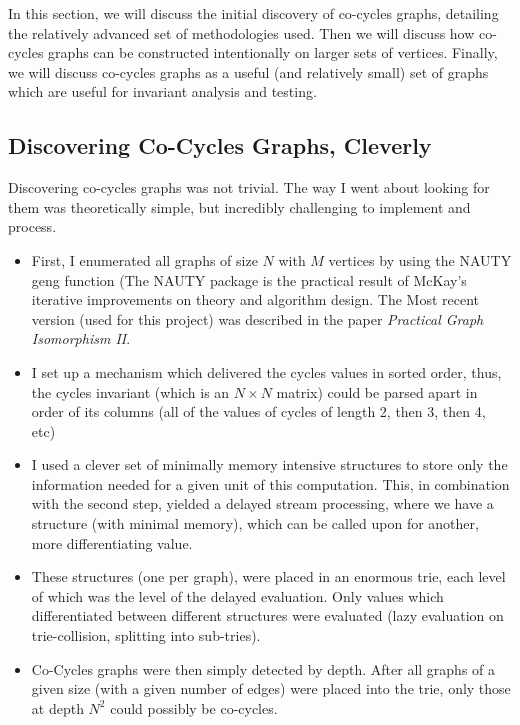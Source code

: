 In this section, we will discuss the initial discovery of co-cycles graphs, detailing the relatively advanced set of methodologies used.
Then we will discuss how co-cycles graphs can be constructed intentionally on larger sets of vertices.
Finally, we will discuss co-cycles graphs as a useful (and relatively small) set of graphs which are useful for invariant analysis and testing.

\subsection{Discovering Co-Cycles Graphs, Cleverly}

Discovering co-cycles graphs was not trivial.
The way I went about looking for them was theoretically simple, but incredibly challenging to implement and process.
\begin{itemize}
\item{First, I enumerated all graphs of size $N$ with $M$ vertices by using the NAUTY geng function (The NAUTY package is the practical result of McKay's iterative improvements on theory and algorithm design. The Most recent version (used for this project) was described in the paper \emph{Practical Graph Isomorphism II}\cite{mckay2014practical}.}
\item{I set up a mechanism which delivered the cycles values in sorted order, thus, the cycles invariant (which is an $N \times N$ matrix) could be parsed apart in order of its columns (all of the values of cycles of length 2, then 3, then 4, etc)}
\item{I used a clever set of minimally memory intensive structures to store only the information needed for a given unit of this computation.  This, in combination with the second step, yielded a delayed stream processing, where we have a structure (with minimal memory), which can be called upon for another, more differentiating value.}
\item{These structures (one per graph), were placed in an enormous trie, each level of which was the level of the delayed evaluation.  Only values which differentiated between different structures were evaluated (lazy evaluation on trie-collision, splitting into sub-tries).}
\item{Co-Cycles graphs were then simply detected by depth. After all graphs of a given size (with a given number of edges) were placed into the trie, only those at depth $N^2$ could possibly be co-cycles.}
\end{itemize}

